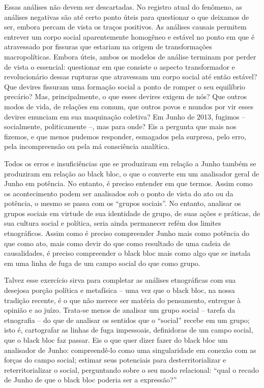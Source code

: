 Essas análises não devem ser descartadas. No registro atual do fenômeno,
as análises negativas são até certo ponto úteis para questionar o que
deixamos de ser, embora percam de vista os traços positivos. As análises
causais permitem entrever um corpo social aparentemente homogêneo e
estável no ponto em que é atravessado por fissuras que estariam na
origem de transformações macropolíticas. Embora úteis, ambos os modelos
de análise terminam por perder de vista o essencial: questionar em que
consiste o aspecto transformador e revolucionário dessas rupturas que
atravessam um corpo social até então estável? Que devires fissuram uma
formação social a ponto de romper o seu equilíbrio precário? Mas,
principalmente, o que esses devires exigem de nós? Que outros modos de
vida, de relações em comum, que outros povos e mundos por vir esses
devires enunciam em sua maquinação coletiva? Em Junho de 2013, fugimos
-- socialmente, politicamente --, mas para onde? Eis a pergunta que mais
nos fizemos, e que menos pudemos responder, esmagados pela surpresa,
pelo erro, pela incompreensão ou pela má consciência analítica.

Todos os erros e insuficiências que se produziram em relação a Junho
também se produziram em relação ao black bloc, o que o converte em um
analisador geral de Junho em potência. No entanto, é preciso entender em
que termos. Assim como os acontecimento podem ser analisados sob o ponto
de vista do ato ou da potência, o mesmo se passa com os ``grupos
sociais''. No entanto, analisar os grupos sociais em virtude de sua
identidade de grupo, de suas ações e práticas, de sua cultura social e
política, seria ainda permanecer refém dos limites etnográficos. Assim
como é preciso compreender Junho mais como potência do que como ato,
mais como devir do que como resultado de uma cadeia de causalidades, é
preciso compreender o black bloc mais como algo que se instala em uma
linha de fuga de um campo social do que como grupo.

Talvez esse exercício sirva para completar as análises etnográficas com
sua desejosa porção política e metafísica -- uma vez que o black bloc,
na nossa tradição recente, é o que não merece ser matéria do pensamento,
entregue à opinião e ao juízo. Trata-se menos de analisar um grupo
social -- tarefa da etnografia -- do que de analisar os sentidos que o
``social'' recebe em um grupo; isto é, cartografar as linhas de fuga
impessoais, definidoras de um campo social, que o black bloc faz passar.
Eis o que quer dizer fazer do black bloc um analisador de Junho:
compreendê-lo como uma singularidade em conexão com as forças do campo
social; estimar seus potenciais para desterritorializar e
reterritorializar o social, perguntando sobre o seu modo relacional:
``qual o recado de Junho de que o black bloc poderia ser a expressão?''

